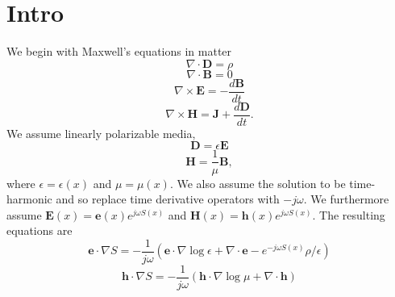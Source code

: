 \documentclass{article}
\theoremstyle{plain}
\begin{document}
\section{Intro}\label{sec:intro}

We begin with Maxwell's equations in matter
\begin{equation}
	\nabla\cdot\mathbf{D} = \rho
\end{equation}
\begin{equation}
	\nabla\cdot\mathbf{B} = 0
\end{equation}
\begin{equation}
	\nabla\times\mathbf{E} = -\frac{d\mathbf{B}}{dt}
\end{equation}
\begin{equation}
	\nabla\times\mathbf{H} = \mathbf{J} + \frac{d\mathbf{D}}{dt}.
\end{equation}
We assume linearly polarizable media,
\begin{equation}
	\mathbf{D} = \epsilon\mathbf{E}
\end{equation}
\begin{equation}
	\mathbf{H} = \frac{1}{\mu}\mathbf{B},
\end{equation}
where $\epsilon=\epsilon(x)$ and $\mu=\mu(x)$. We also assume the solution to be time-harmonic and so replace time derivative operators with $-j\omega$. We furthermore assume $\mathbf{E}(x) = \mathbf{e}(x)e^{j\omega S(x)}$ and $\mathbf{H}(x) = \mathbf{h}(x)e^{j\omega S(x)}$. The resulting equations are
\begin{equation}\label{eq:max1}
	\mathbf{e}\cdot\nabla S = -\frac{1}{j\omega}\left( \mathbf{e}\cdot\nabla\log{\epsilon} + \nabla\cdot\mathbf{e}-e^{-j\omega S(x)}\rho/\epsilon \right)
\end{equation}
\begin{equation}\label{eq:max2}
	\mathbf{h}\cdot\nabla S = -\frac{1}{j\omega}\left( \mathbf{h}\cdot\nabla\log{\mu} + \nabla\cdot\mathbf{h}\right)
\end{equation}
\end{document}
